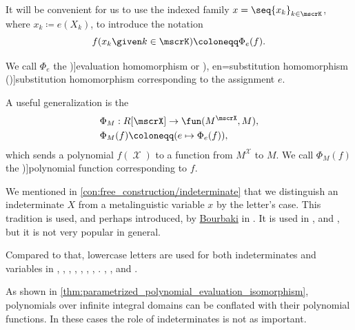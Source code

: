 \begin{concept}
\begin{thmenum}
    It will be convenient for us to use the indexed family \( x = \seq{ x_k }_{k \in \mscrK} \), where \( x_k \coloneqq e(X_k) \), to introduce the notation
    \begin{equation*}
      f(x_k \given k \in \mscrK) \coloneqq \Phi_e(f).
    \end{equation*}

    We call \( \Phi_e \) the \term[en=evaluation homomorphism (\cite[98]{Lang2002Algebra})]{evaluation homomorphism} or \term[ru=подстановка (\cite[184]{Кострикин2020АлгебраЧасть1}), en=substitution homomorphism (\cite[151]{Knapp2016BasicAlgebra})]{substitution homomorphism} corresponding to the assignment \( e \).

    A useful generalization is the 
    \begin{equation*}
      \begin{aligned}
        &\Phi_M: R[\mscrX] \to \fun(M^\mscrX, M), \\
        &\Phi_M(f) \coloneqq (e \mapsto \Phi_e(f)),
      \end{aligned}
    \end{equation*}
    which sends a polynomial \( f(\mscrX) \) to a function from \( M^\mscrX \) to \( M \). We call \( \Phi_M(f) \) the \term[en=polynomial function (\cite[4]{Bourbaki2003Algebra4to7})]{polynomial function} corresponding to \( f \).
  \end{thmenum}
\end{concept}

\begin{remark}\label{rem:conventions_for_indeterminates}
  We mentioned in \cref{con:free_construction/indeterminate} that we distinguish an indeterminate \( X \) from a metalinguistic variable \( x \) by the letter's case. This tradition is used, and perhaps introduced, by \hyperref[rem:bourbaki]{Bourbaki} in \cite[A III.25]{Bourbaki1970Algèbre1à3}. It is used in \cite[ch. 4]{Lang2002Algebra}, \cite[9]{Knapp2016BasicAlgebra} and \cite[182]{Кострикин2020АлгебраЧасть1}, but it is not very popular in general.

  Compared to that, lowercase letters are used for both indeterminates and variables in
  \cite[122]{Jacobson1985BasicAlgebraI},
  \cite[43]{Rotman2015AdvancedModernAlgebraPart1},
  \cite[23]{Eisenbud1995CommutativeAlgebra},
  \cite[def. III.1.19]{Aluffi2009Algebra},
  \cite[36]{Golan1999Semirings},
  \cite[97]{Lang2002Algebra},
  \cite[131]{Курош1968КурсВысшейАлгебры},
  \cite[12]{Тыртышников2017ОсновыАлгебры}.
  \cite[92]{Винберг2014КурсАлгебры},
  \cite[405]{Обрешков1962ВисшаАлгебра},
  \cite[4]{КоцевСидеров2016КомутативнаАлгебра} and
  \cite[135]{ГеновМиховскиМоллов1991Алгебра}.

  As shown in \cref{thm:parametrized_polynomial_evaluation_isomorphism}, polynomials over infinite integral domains can be conflated with their polynomial functions. In these cases the role of indeterminates is not as important.
\end{remark}

